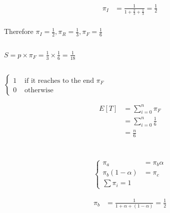 \documentclass[12pt, a4paper]{article}
\begin{document}
\begin{subequations}
  \begin{align}
    \pi_I &= \frac{1}{1+\frac{2}{3}+\frac{1}{3}} = \frac{1}{2}\\
  \end{align}
\end{subequations}

Therefore $\pi_I = \frac{1}{2}, \pi_R = \frac{1}{3}, \pi_F = \frac{1}{6}$
\subsection{}
$S = p \times \pi_F = \frac{1}{3} \times \frac{1}{6} = \frac{1}{18}$
\subsection{}
$\begin{cases}
  1 & \text{ if it reaches to the end } \pi_F\\
  0 & \text{ otherwise }
\end{cases}$

\begin{subequations}
  \begin{align}
    E[T] &= \sum_{i=0}^n \pi_F \\
         &= \sum_{i=0}^n \frac{1}{6}\\
         &= \frac{n}{6}
  \end{align}
\end{subequations}

\section{}
\subsection{}
\begin{subequations}
  \begin{align}
    \begin{cases} 
      \pi_a &= \pi_b \alpha\\
      \pi_b (1-\alpha) &= \pi_c\\
      \sum \pi_i = 1
    \end{cases}
  \end{align}
\end{subequations}

\begin{subequations}
  \begin{align}
    \pi_b &= \frac{1}{1+\alpha+(1-\alpha)} = \frac{1}{2}\\
  \end{align}
\end{subequations}
\end{document}
